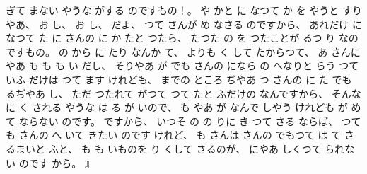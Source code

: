 ぎて
まない
やうな
がする
のですもの！。
%
や
かと
に
なつて
か
を
やうと
すりやあ、
%
お
し、
%
お
し、
%
だよ、
%
つて
さんが
め
なさる
のですから、
%
あれだけ
になつて
た
に
さんの
%
に
か
たと
つたら、
%
たつた
の
を
つたことが
るつ
り
なのですもの。
%
の
から
に
たり
なんか
て、
%
よりも
く
して
たからつて、
%
あ
さんにやあ
も
も
も
い
だし、
%
そりやあ
が
でも
さんの
になら
の
へなりと
らう
つていふ
だけは
つて
ます
けれども、
%
までの
ところ
ぢやあ
つ
さんの
に
た
でも
るぢやあ
し、
%
ただ%
つたれて
がつて
つて
たと
ふだけの
なんですから、
%
そんなに
く
される
やうな
は
る
が
いので、
%
も
やあ
が
なんで
しやう
けれども
が
めて
ならない
のです。
%
ですから、
%
いつそ
の
の
りに
き
つて
さる
ならば、
%
つても
さんの
へ
いて
きたい
のです
けれど、
%
も
さんは
さんの
でもつて
は
て
さるまいと
ふと、
%
も
も
いものを
り
くして
さるのが、
%
にやあ
しくつて
られない
のです
から。
』

